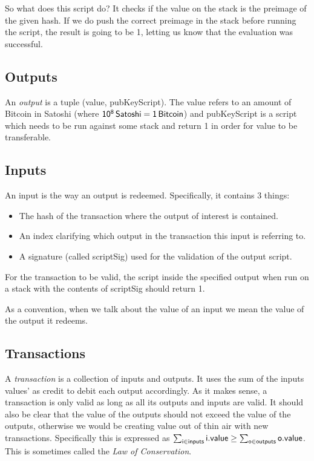 So what does this script do? It checks if the value on the stack is the preimage of the given hash. If we do push the correct preimage in the stack before running the script, the result is going to be 1, letting us know that the evaluation was successful.

\subsection{Outputs}
An \emph{output} is a tuple ({\sf value, pubKeyScript}). The \textsf{value} refers to an amount of Bitcoin in Satoshi (where $\sf 10^8 \, Satoshi = 1 \, Bitcoin$) and \textsf{pubKeyScript} is a script which needs to be run against some stack and return 1 in order for \textsf{value} to be transferable.

\subsection{Inputs}
An input is the way an output is redeemed. Specifically, it contains 3 things:
\begin{itemize}
  \item The hash of the transaction where the output of interest is contained.
  \item An index clarifying which output in the transaction this input is referring to.
  \item A signature (called \textsf{scriptSig}) used for the validation of the output script.
\end{itemize}

For the transaction to be valid, the script inside the specified output when run on a stack with the contents of \textsf{scriptSig} should return 1.

As a convention, when we talk about the value of an input we mean the value of the output it redeems.

\subsection{Transactions}
A \emph{transaction} is a collection of inputs and outputs. It uses the sum of the inputs values' as credit to debit each output accordingly. As it makes sense, a transaction is only valid as long as all its outputs and inputs are valid. It should also be clear that the value of the outputs should not exceed the value of the outputs, otherwise we would be creating value out of thin air with new transactions. Specifically this is expressed as $\sum_{\sf i \in inputs} {\sf i.value} \ge \sum_{\sf o \in outputs} {\sf o.value}$. This is sometimes called the \emph{Law of Conservation}.

